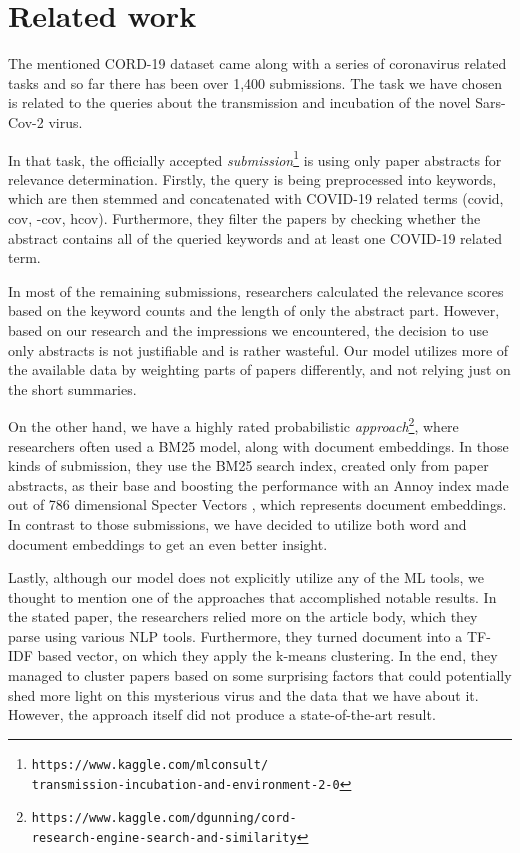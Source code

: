 \documentclass[10pt, a4paper]{article}
\begin{document}
	\section{Related work}

	The mentioned CORD-19 dataset came along with a series of coronavirus related tasks and so far there has been over 1,400 submissions. The task we have chosen is related to the queries about the transmission and incubation of the novel Sars-Cov-2 virus.

	In that task, the officially accepted \emph{submission}\footnote{\texttt{https://www.kaggle.com/mlconsult/\\transmission-incubation-and-environment-2-0}} is using only paper abstracts for relevance determination. Firstly, the query is being preprocessed into keywords, which are then stemmed and concatenated with COVID-19 related terms (covid, cov, -cov, hcov). Furthermore, they filter the papers by checking whether the abstract contains all of the queried keywords and at least one COVID-19 related term.

	In most of the remaining submissions, researchers calculated the relevance scores based on the keyword counts and the length of only the abstract part. However, based on our research and the impressions we encountered, the decision to use only abstracts is not justifiable and is rather wasteful. Our model utilizes more of the available data by weighting parts of papers differently, and not relying just on the short summaries.

	On the other hand, we have a highly rated probabilistic \emph{approach}\footnote{\texttt{https://www.kaggle.com/dgunning/cord-\\research-engine-search-and-similarity}}, where researchers often used a BM25 model, along with document embeddings. In those kinds of submission, they use the BM25 search index, created only from paper abstracts, as their base and boosting the performance with an Annoy index made out of 786 dimensional Specter Vectors \citep{cohan-etal-2020-specter}, which represents document embeddings. In contrast to those submissions, we have decided to utilize both word and document embeddings to get an even better insight.

	Lastly, although our model does not explicitly utilize any of the ML tools, we thought to mention one of the approaches that accomplished notable results. In the stated paper, the researchers relied more on the article body, which they parse using various NLP tools. Furthermore, they turned document into a TF-IDF based vector, on which they apply the k-means clustering. In the end, they managed to cluster papers based on some surprising factors that could potentially shed more light on this mysterious virus and the data that we have about it. However, the approach itself did not produce a state-of-the-art result.
\end{document}
